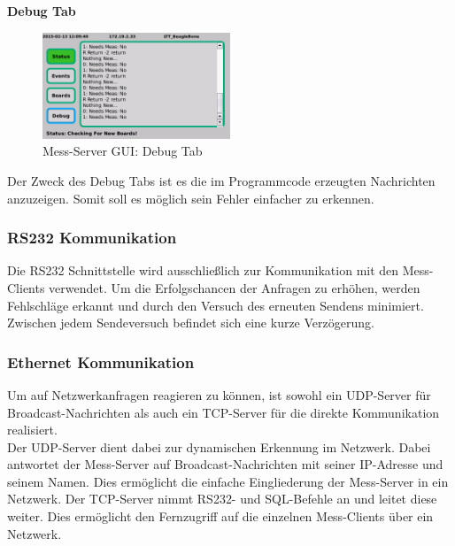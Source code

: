 \textbf{Debug Tab}

\begin{figure}[H]
\begin{center}
\includegraphics[width=0.5\textwidth ]{img/GUI/Server_GUI_Debug2.png}
\caption{Mess-Server GUI: Debug Tab}
\label{figure_MessServerGUIDebug}
\end{center}
\end{figure}

Der Zweck des Debug Tabs ist es die im Programmcode erzeugten Nachrichten anzuzeigen. Somit soll es möglich sein Fehler einfacher zu erkennen.

\subsubsection{RS232 Kommunikation}
Die RS232 Schnittstelle wird ausschließlich zur Kommunikation mit den Mess-Clients verwendet. Um die Erfolgschancen der Anfragen zu erhöhen, werden Fehlschläge erkannt und durch den Versuch des erneuten Sendens minimiert. Zwischen jedem Sendeversuch befindet sich eine kurze Verzögerung.
 

\subsubsection{Ethernet Kommunikation}

Um auf Netzwerkanfragen reagieren zu können, ist sowohl ein UDP-Server für Broadcast-Nachrichten als auch ein TCP-Server für die direkte Kommunikation realisiert.\\
Der UDP-Server dient dabei zur dynamischen Erkennung im Netzwerk. Dabei antwortet der Mess-Server auf Broadcast-Nachrichten mit seiner IP-Adresse und seinem Namen. Dies ermöglicht die einfache Eingliederung der Mess-Server in ein Netzwerk.
Der TCP-Server nimmt RS232- und SQL-Befehle an und leitet diese weiter. Dies ermöglicht den Fernzugriff auf die einzelnen Mess-Clients über ein Netzwerk. 

